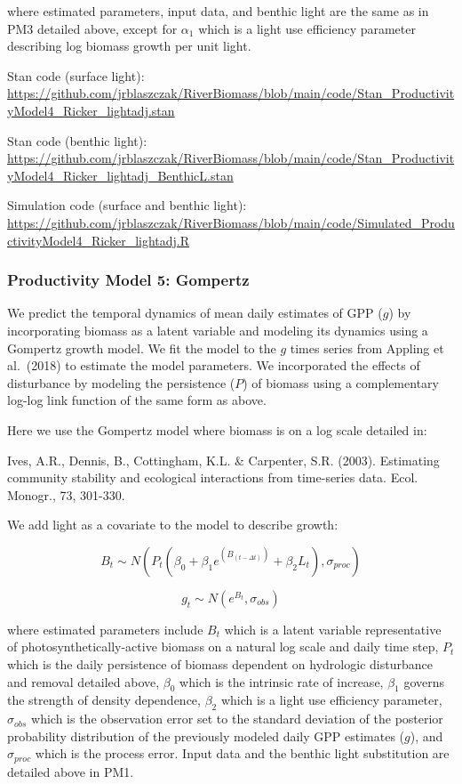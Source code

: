 \documentclass[
]{article}
\begin{document}
where estimated parameters, input data, and benthic light are the same
as in PM3 detailed above, except for \(\alpha_1\) which is a light use
efficiency parameter describing log biomass growth per unit light.

Stan code (surface light):
\url{https://github.com/jrblaszczak/RiverBiomass/blob/main/code/Stan_ProductivityModel4_Ricker_lightadj.stan}

Stan code (benthic light):
\url{https://github.com/jrblaszczak/RiverBiomass/blob/main/code/Stan_ProductivityModel4_Ricker_lightadj_BenthicL.stan}

Simulation code (surface and benthic light):
\url{https://github.com/jrblaszczak/RiverBiomass/blob/main/code/Simulated_ProductivityModel4_Ricker_lightadj.R}

\hypertarget{productivity-model-5-gompertz}{%
\subsubsection{Productivity Model 5:
Gompertz}\label{productivity-model-5-gompertz}}

We predict the temporal dynamics of mean daily estimates of GPP (\(g\))
by incorporating biomass as a latent variable and modeling its dynamics
using a Gompertz growth model. We fit the model to the \(g\) times
series from Appling et al.~(2018) to estimate the model parameters. We
incorporated the effects of disturbance by modeling the persistence
(\(P\)) of biomass using a complementary log-log link function of the
same form as above.

Here we use the Gompertz model where biomass is on a log scale detailed
in:

Ives, A.R., Dennis, B., Cottingham, K.L. \& Carpenter, S.R. (2003).
Estimating community stability and ecological interactions from
time-series data. Ecol. Monogr., 73, 301-330.

We add light as a covariate to the model to describe growth:

\begin{equation}
    B_{t} \sim N(P_{t}(\beta_{0} + \beta_{1}e^{(B_{(t-\Delta t)})} + \beta_{2}L_{t}), \sigma_{proc})
\end{equation}

\begin{equation}
    g_{t} \sim N(e^{B_{t}},\sigma_{obs})
\end{equation}

where estimated parameters include \(B_{t}\) which is a latent variable
representative of photosynthetically-active biomass on a natural log
scale and daily time step, \(P_{t}\) which is the daily persistence of
biomass dependent on hydrologic disturbance and removal detailed above,
\(\beta_0\) which is the intrinsic rate of increase, \(\beta_1\) governs
the strength of density dependence, \(\beta_2\) which is a light use
efficiency parameter, \(\sigma_{obs}\) which is the observation error
set to the standard deviation of the posterior probability distribution
of the previously modeled daily GPP estimates (\(g\)), and
\(\sigma_{proc}\) which is the process error. Input data and the benthic
light substitution are detailed above in PM1.
\end{document}
